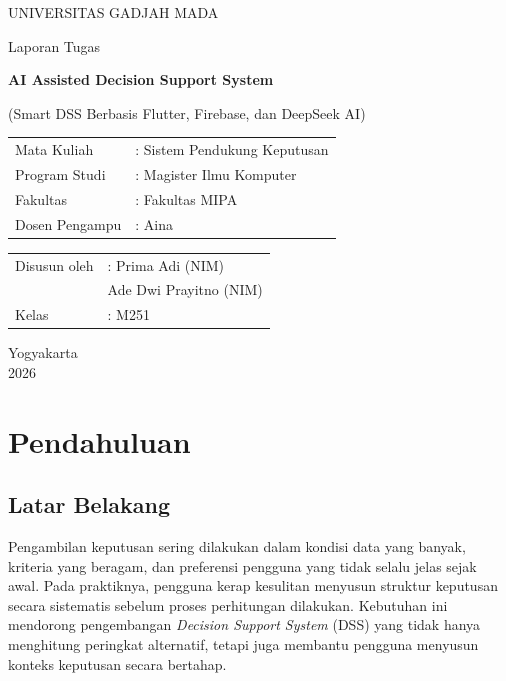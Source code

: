 \documentclass[12pt,a4paper]{article}
\begin{document}
\hypersetup{pageanchor=false}

\begin{titlepage}
  \centering
  {\Large UNIVERSITAS GADJAH MADA\par}
  \vspace{0.5cm}
  {\large Laporan Tugas\par}
  \vspace{1.2cm}
  {\LARGE \textbf{AI Assisted Decision Support System}\par}
  \vspace{0.5cm}
  {\large (Smart DSS Berbasis Flutter, Firebase, dan DeepSeek AI)\par}
  \vfill

  \begin{tabular}{ll}
    Mata Kuliah & : Sistem Pendukung Keputusan \\
    Program Studi & : Magister Ilmu Komputer \\
    Fakultas & : Fakultas MIPA \\
    Dosen Pengampu & : Aina \\
  \end{tabular}

  \vspace{1.2cm}
  \begin{tabular}{ll}
    Disusun oleh & : Prima Adi (NIM) \\
                & \hspace{0.35cm}Ade Dwi Prayitno (NIM) \\
    Kelas       & : M251 \\
  \end{tabular}

  \vfill
  {\large Yogyakarta\\2026}
\end{titlepage}

\tableofcontents
\clearpage

\hypersetup{pageanchor=true}

\section{Pendahuluan}
\subsection{Latar Belakang}
Pengambilan keputusan sering dilakukan dalam kondisi data yang banyak, kriteria yang beragam, dan preferensi pengguna yang tidak selalu jelas sejak awal. Pada praktiknya, pengguna kerap kesulitan menyusun struktur keputusan secara sistematis sebelum proses perhitungan dilakukan. Kebutuhan ini mendorong pengembangan \textit{Decision Support System} (DSS) yang tidak hanya menghitung peringkat alternatif, tetapi juga membantu pengguna menyusun konteks keputusan secara bertahap.
\end{document}
